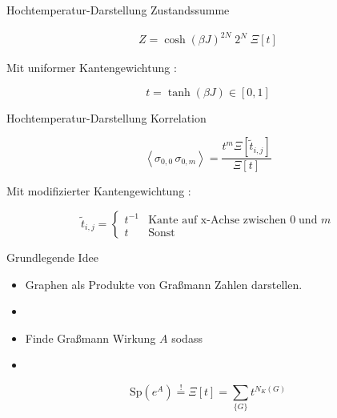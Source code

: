 \documentclass[11pt]{beamer}
\newcommand{\corr}[1]{\left\langle #1 \right\rangle}
\newcommand{\Sp}[1]{\mathrm{Sp}\left( #1 \right)}
\begin{document}
    
    \begin{frame}{Hochtemperatur-Darstellung Zustandssumme}
        \begin{grayframe}[frametitle = {Zustandssumme}]
            \begin{align} \nonumber
             Z = \cosh(\beta J)^{2N} \; 2^N \; \Xi[t] 
            \end{align}
            
            \vspace{0.8cm}
            Mit uniformer Kantengewichtung :
            
            \centering
            $$ t = \tanh(\beta J)\in [0,1]$$
            \vspace{0.3cm}
        \end{grayframe}   
    \end{frame}
    
    \begin{frame}{Hochtemperatur-Darstellung Korrelation}
    
    \begin{grayframe}[frametitle = {Spin-Spin-Korrelation}]
    \begin{equation} \nonumber
    \corr{\sigma_{0,0}\,\sigma_{0,m}} = \frac{t^m \Xi[\tilde{t}_{i,j}]}{\Xi[t]} 
    \end{equation}
    
    \vspace{0.8cm}
    Mit modifizierter Kantengewichtung : 
    
    \begin{equation} \nonumber
    \tilde{t}_{i,j} = \left\{\begin{array}{ll} t^{-1} & \text{Kante auf x-Achse zwischen } 0 \; \text{und } m\\
          t & \text{Sonst} \end{array} \right.
    \end{equation}
    \vspace{0.3cm}
    \end{grayframe}
    \end{frame}
    
    \begin{frame}{Grundlegende Idee}
    \begin{itemize}
    \item Graphen als Produkte von Graßmann Zahlen darstellen.
    \item[]
    \pause
    \item Finde Graßmann Wirkung $A$ sodass
    \item[]
    \end{itemize}
    \begin{equation} \nonumber
    \Sp{e^A} \overset{!}{=} \Xi[t] = \sum_{\{ G\}} t^{N_K(G)}
    \end{equation}
    \end{frame}
    
\end{document}
